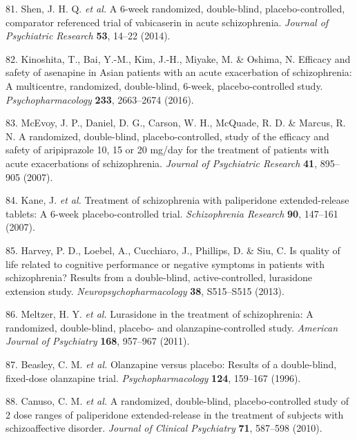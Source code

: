 \documentclass[9pt,english,,jou,floatsintext]{apa6}
\begin{document}
\hypertarget{ref-Shen2014}{}
81. Shen, J. H. Q. \emph{et al.} A 6-week randomized, double-blind,
placebo-controlled, comparator referenced trial of vabicaserin in acute
schizophrenia. \emph{Journal of Psychiatric Research} \textbf{53},
14--22 (2014).

\hypertarget{ref-Kinoshita2016}{}
82. Kinoshita, T., Bai, Y.-M., Kim, J.-H., Miyake, M. \& Oshima, N.
Efficacy and safety of asenapine in Asian patients with an acute
exacerbation of schizophrenia: A multicentre, randomized, double-blind,
6-week, placebo-controlled study. \emph{Psychopharmacology}
\textbf{233}, 2663--2674 (2016).

\hypertarget{ref-McEvoy2007}{}
83. McEvoy, J. P., Daniel, D. G., Carson, W. H., McQuade, R. D. \&
Marcus, R. N. A randomized, double-blind, placebo-controlled, study of
the efficacy and safety of aripiprazole 10, 15 or 20 mg/day for the
treatment of patients with acute exacerbations of schizophrenia.
\emph{Journal of Psychiatric Research} \textbf{41}, 895--905 (2007).

\hypertarget{ref-Kane2007}{}
84. Kane, J. \emph{et al.} Treatment of schizophrenia with paliperidone
extended-release tablets: A 6-week placebo-controlled trial.
\emph{Schizophrenia Research} \textbf{90}, 147--161 (2007).

\hypertarget{ref-Harvey2013}{}
85. Harvey, P. D., Loebel, A., Cucchiaro, J., Phillips, D. \& Siu, C. Is
quality of life related to cognitive performance or negative symptoms in
patients with schizophrenia? Results from a double-blind,
active-controlled, lurasidone extension study.
\emph{Neuropsychopharmacology} \textbf{38}, S515--S515 (2013).

\hypertarget{ref-Meltzer2011}{}
86. Meltzer, H. Y. \emph{et al.} Lurasidone in the treatment of
schizophrenia: A randomized, double-blind, placebo- and
olanzapine-controlled study. \emph{American Journal of Psychiatry}
\textbf{168}, 957--967 (2011).

\hypertarget{ref-Beasley1996a}{}
87. Beasley, C. M. \emph{et al.} Olanzapine versus placebo: Results of a
double-blind, fixed-dose olanzapine trial. \emph{Psychopharmacology}
\textbf{124}, 159--167 (1996).

\hypertarget{ref-Canuso2010a}{}
88. Canuso, C. M. \emph{et al.} A randomized, double-blind,
placebo-controlled study of 2 dose ranges of paliperidone
extended-release in the treatment of subjects with schizoaffective
disorder. \emph{Journal of Clinical Psychiatry} \textbf{71}, 587--598
(2010).
\end{document}
